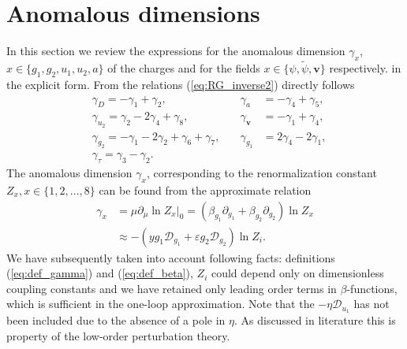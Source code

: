 \documentclass[aps,pre,url,twocolumn,superscriptaddress]{revtex4-1}
\def\eps{\varepsilon}
\def\mv{{\bm v}}
\def\D{\mathcal{D}}
\begin{document}
\section{Anomalous dimensions \label{app:special}}
In this section we review the expressions
for the anomalous dimension $\gamma_x$, $x\in\{g_1,g_2,u_1,u_2,a\}$ of the
charges and for the fields $x\in\{\psi,\tilde{\psi},\mv\}$ respectively.
in the explicit form. 
From the relations (\ref{eq:RG_inverse2}) directly follows
\begin{align}
   & \gamma_D = -\gamma_1 + \gamma_2, \quad
   & \gamma_a & = -\gamma_4 + \gamma_5, \nonumber\\
   & \gamma_{u_2} = \gamma_2 -2 \gamma_4 + \gamma_8,  \quad
   & \gamma_{\mv} & = -\gamma_1 + \gamma_4,  \nonumber \\
   & \gamma_{g_2} = -\gamma_1 -2\gamma_2 +\gamma_6 + \gamma_7,\quad 
   & \gamma_{g_1} & = 2\gamma_4 - 2\gamma_1,\\
   & \gamma_\tau = \gamma_3 - \gamma_2.
\end{align}
The anomalous dimension $\gamma_x$, corresponding to the renormalization
constant $Z_x, x\in\{1,2,\ldots,8\}$ can be found from the approximate relation
\begin{align}
  \gamma_x & = \mu\partial_\mu \ln Z_x|_0 = (\beta_{g_1}\partial_{g_1}+
  \beta_{g_2}\partial_{g_2}  )\ln Z_x \nonumber \\
   & \approx -(y g_1\D_{g_1} + \eps g_2 \D_{g_2})\ln Z_i.
\end{align}
We have subsequently taken into account following facts:
definitions (\ref{eq:def_gamma}) and (\ref{eq:def_beta}), $Z_i$
could depend only on dimensionless coupling constants 
 and we have retained only leading order terms in $\beta$-functions,
which is sufficient in the one-loop approximation. Note that the 
$-\eta\D_{u_1}$ has not been included due to the absence of a pole in $\eta$. 
As discussed in literature \cite{Ant99} this is property of the low-order 
perturbation theory.
\end{document}
